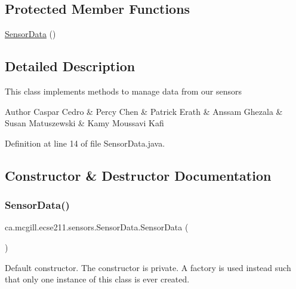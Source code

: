 \subsection*{Protected Member Functions}
\begin{DoxyCompactItemize}
\item 
\hyperlink{classca_1_1mcgill_1_1ecse211_1_1sensors_1_1_sensor_data_a41b9929f62455a15364385a339b4b910}{Sensor\+Data} ()
\end{DoxyCompactItemize}


\subsection{Detailed Description}
This class implements methods to manage data from our sensors

\begin{DoxyAuthor}{Author}
Caspar Cedro \& Percy Chen \& Patrick Erath \& Anssam Ghezala \& Susan Matuszewski \& Kamy Moussavi Kafi 
\end{DoxyAuthor}


Definition at line 14 of file Sensor\+Data.\+java.



\subsection{Constructor \& Destructor Documentation}
\mbox{\label{classca_1_1mcgill_1_1ecse211_1_1sensors_1_1_sensor_data_a41b9929f62455a15364385a339b4b910}} 
\subsubsection{\texorpdfstring{Sensor\+Data()}{SensorData()}}
{\footnotesize\ttfamily ca.\+mcgill.\+ecse211.\+sensors.\+Sensor\+Data.\+Sensor\+Data (\begin{DoxyParamCaption}{ }\end{DoxyParamCaption})\hspace{0.3cm}{\ttfamily [protected]}}

Default constructor. The constructor is private. A factory is used instead such that only one instance of this class is ever created. 

